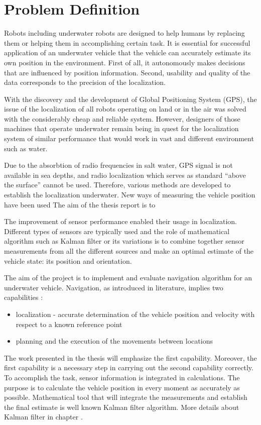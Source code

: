 \chapter{Problem Definition} \label{chap:problem-def}

Robots including underwater robots are designed to help humans by replacing them or helping them in accomplishing certain task. It is essential for successful application of an underwater vehicle that the vehicle can accurately estimate its own position in the environment. First of all, it autonomously makes decisions that are influenced by position information. Second, usability and quality of the data corresponds to the precision of the localization.

With the discovery and the development of Global Positioning System (GPS), the issue of the localization of all robots operating on land or in the air was solved with the considerably cheap and reliable system. However, designers of those machines that operate underwater remain being in quest for the localization system of similar performance that would work in vast and different environment such as water.

Due to the absorbtion of radio frequencies in salt water, GPS signal is not available in sea depths, and radio localization which serves as standard ``above the surface'' cannot be used. Therefore, various methods are developed to establish the localization underwater. New ways of measuring the vehicle position have been used  The aim of the thesis report is to  

The improvement of sensor performance enabled their usage in localization. Different types of sensors are typically used and the role of mathematical algorithm such as Kalman filter or its variations is to combine together sensor measurements from all the different sources and make an optimal estimate of the vehicle state: its position and orientation. 

The aim of the project is to implement and evaluate navigation algorithm for an underwater vehicle. Navigation, as introduced in literature, implies two capabilities \cite{farrell98}:
\begin{itemize}
\item localization - accurate determination of the vehicle position and velocity with respect to a known reference point
\item planning and the execution of the movements between locations   
\end{itemize} 
The work presented in the thesis will emphasize the first capability. Moreover, the first capability is a necessary step in carrying out the second capability correctly. To accomplish the task, sensor information is integrated in calculations. The purpose is to calculate the vehicle position in every moment as accurately as possible. Mathematical tool that will integrate the measurements and establish the final estimate is well known Kalman filter \cite{} algorithm. More details about Kalman filter in chapter \label{chap:KalmanFilter}. 

